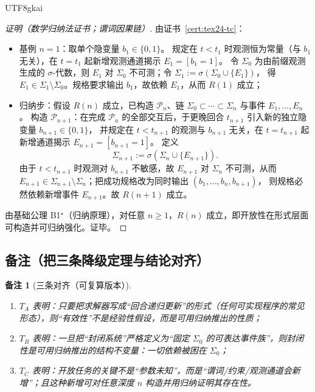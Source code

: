 \documentclass[12pt]{article}
\newtheorem{remark}{备注}[section]
\begin{document}
\begin{CJK*}{UTF8}{gkai}
\begin{proof}[证明（数学归纳法证书；谓词因果链）]
由证书~\ref{cert:tex24-tc}：
\begin{itemize}
  \item 基例 $n=1$：取单个隐变量 $b_1\in\{0,1\}$。
  规定在 $t<t_1$ 时观测恒为常量（与 $b_1$ 无关），在 $t=t_1$ 起新增观测通道揭示 $E_1=[b_1=1]$。
  令 $\Sigma_0$ 为由前缀观测生成的 $\sigma$-代数，则 $E_1$ 对 $\Sigma_0$ 不可测；令 $\Sigma_1:=\sigma(\Sigma_0\cup\{E_1\})$，
  得 $E_1\in\Sigma_1\setminus\Sigma_0$。规格要求输出 $b_1$，故依赖 $E_1$，从而 $R(1)$ 成立；
  \item 归纳步：假设 $R(n)$ 成立，已构造 $\mathcal{P}_n$、链 $\Sigma_0\subset\cdots\subset\Sigma_n$ 与事件 $E_1,\dots,E_n$。
  构造 $\mathcal{P}_{n+1}$：在完成 $\mathcal{P}_n$ 的全部交互后，于更晚回合 $t_{n+1}$ 引入新的独立隐变量 $b_{n+1}\in\{0,1\}$，
  并规定在 $t<t_{n+1}$ 的观测与 $b_{n+1}$ 无关，在 $t=t_{n+1}$ 起新增通道揭示
  $E_{n+1}=[b_{n+1}=1]$。
  定义
  \[
    \Sigma_{n+1}:=\sigma(\Sigma_n\cup\{E_{n+1}\}).
  \]
  由于 $t<t_{n+1}$ 时观测对 $b_{n+1}$ 不敏感，故 $E_{n+1}$ 对 $\Sigma_n$ 不可测，从而
  $E_{n+1}\in\Sigma_{n+1}\setminus\Sigma_n$；把成功规格改为同时输出 $(b_1,\dots,b_n,b_{n+1})$，
  则规格必然依赖新增事件 $E_{n+1}$。故 $R(n+1)$ 成立。
\end{itemize}
由基础公理 B1$^\star$（归纳原理），对任意 $n\ge 1$，$R(n)$ 成立，即开放性在形式层面可构造并可归纳强化。证毕。
\end{proof}

\subsection{备注（把三条降级定理与结论对齐）}
\label{sec:tex24-ta-tb-tc-remark}

\begin{remark}[三条对齐（可复算版本）]
\begin{enumerate}
  \item $T_A$ 表明：只要把求解器写成“回合递归更新”的形式（任何可实现程序的常见形态），则“有效性”不是经验性假设，而是可用归纳推出的性质；
  \item $T_B$ 表明：一旦把“封闭系统”严格定义为“固定 $\Sigma_0$ 的可表达事件族”，则封闭性是可用归纳推出的结构不变量：一切依赖被困在 $\Sigma_0$；
  \item $T_C$ 表明：开放任务的关键不是“参数未知”，而是“谓词/约束/观测通道会新增”；且这种新增可对任意深度 $n$ 构造并用归纳证明其存在性。
\end{enumerate}
\end{remark}

\end{CJK*}
\end{document}

